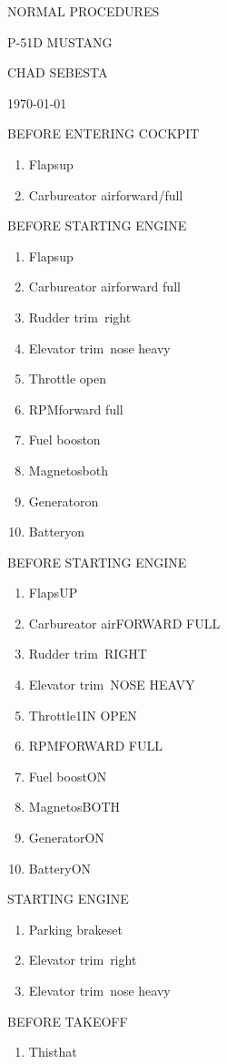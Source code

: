 \documentclass[11pt,letterpaper,twocolumn]{article}
\newcommand*{\aircraft}{p-51d mustang} %
\newcommand*{\doctitle}{normal procedures} %
\newcommand*{\protitle}[1]{{\sf\Large\MakeUppercase{#1}}} %
\newcommand*{\proitem}[2]{\sf\item#1\dotfill#2} %
\newenvironment*{prolist}[1]
	{
	\begin{center}
	\protitle{#1}
	\begin{enumerate}[noitemsep]
	}
	{
	\end{enumerate}
	\end{center}
	}
\begin{document}

\begin{titlepage}

	\sf

	\centering

	{\Huge\MakeUppercase{\doctitle}}

	\vspace{0.1in}

	{\Huge\MakeUppercase{\aircraft}}

	\vspace{1in}

	\MakeUppercase{Chad Sebesta}

	\MakeUppercase{\today}

	\thispagestyle{empty} %

\end{titlepage}


	\begin{prolist}{BEFORE ENTERING COCKPIT}
		\proitem{Flaps}{up}
		\proitem{Carbureator air}{forward/full}
	\end{prolist}

	\begin{prolist}{BEFORE STARTING ENGINE}
		\proitem{Flaps}{up}
		\proitem{Carbureator air}{forward full}
		\proitem{Rudder trim}{5\textdegree\ right}
		\proitem{Elevator trim}{2\textdegree\ nose heavy}
		\proitem{Throttle}{1in open}
		\proitem{RPM}{forward full}
		\proitem{Fuel boost}{on}
		\proitem{Magnetos}{both}
		\proitem{Generator}{on}
		\proitem{Battery}{on}
	\end{prolist}

	\begin{prolist}{BEFORE STARTING ENGINE}
		\proitem{Flaps}{UP}
		\proitem{Carbureator air}{FORWARD FULL}
		\proitem{Rudder trim}{5\textdegree\ RIGHT}
		\proitem{Elevator trim}{2\textdegree\ NOSE HEAVY}
		\proitem{Throttle}{1IN OPEN}
		\proitem{RPM}{FORWARD FULL}
		\proitem{Fuel boost}{ON}
		\proitem{Magnetos}{BOTH}
		\proitem{Generator}{ON}
		\proitem{Battery}{ON}
	\end{prolist}


	\begin{prolist}{STARTING ENGINE}
		\proitem{Parking brake}{set}
		\proitem{Elevator trim}{5\textdegree\ right}
		\proitem{Elevator trim}{2\textdegree\ nose heavy}
	\end{prolist}

	\begin{prolist}{BEFORE TAKEOFF}
		\proitem{This}{that}
	\end{prolist}
\end{document}

